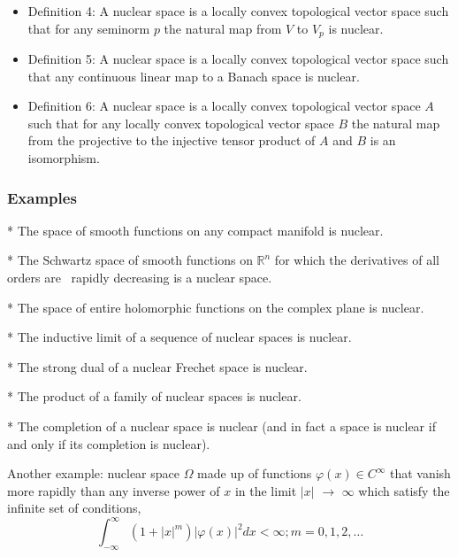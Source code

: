 \documentclass[aps,preprint]{revtex4}%
\begin{document}
\begin{itemize}
\item Definition 4: A nuclear space is a locally convex topological vector
space such that for any seminorm $p$ the natural map from $V$ to $V_{p}$ is nuclear.

\item Definition 5: A nuclear space is a locally convex topological vector
space such that any continuous linear map to a Banach space is nuclear.

\item Definition 6: A nuclear space is a locally convex topological vector
space $A$ such that for any locally convex topological vector space $B$ the
natural map from the projective to the injective tensor product of $A$ and $B$
is an isomorphism.
\end{itemize}

\subsubsection{Examples}

* The space of smooth functions on any compact manifold is nuclear.

* The Schwartz space of smooth functions on $\mathbb{R}^{n}$ for which the
derivatives of all orders are \qquad\qquad\ rapidly decreasing is a nuclear space.

* The space of entire holomorphic functions on the complex plane is nuclear.

* The inductive limit of a sequence of nuclear spaces is nuclear.

* The strong dual of a nuclear Frechet space is nuclear.

* The product of a family of nuclear spaces is nuclear.

* The completion of a nuclear space is nuclear (and in fact a space is nuclear
if and only if its completion is nuclear).

Another example: nuclear space $\Omega$ made up of functions $\varphi\left(
x\right)  \in C^{\infty}$ that vanish more rapidly than any inverse power of
$x$ in the limit $\left\vert x\right\vert $ $\rightarrow$ $\infty$ which
satisfy the infinite set of conditions,%
\[
\int_{-\infty}^{\infty}\left(  1+\left\vert x\right\vert ^{m}\right)
\left\vert \varphi\left(  x\right)  \right\vert ^{2}dx<\infty;m=0,1,2,\ldots
\]
\end{document}
